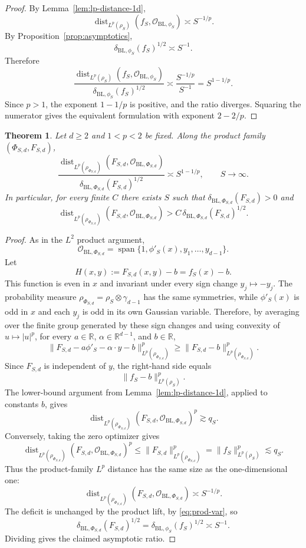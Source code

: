 \documentclass[11pt]{amsart}
\newtheorem{theorem}{Theorem}[section]
\theoremstyle{remark}
\DeclareMathOperator{\dist}{dist}
\DeclareMathOperator{\spanop}{span}
\newcommand{\R}{\mathbb R}
\newcommand{\cO}{\mathcal O}
\newcommand{\BL}{\mathrm{BL}}
\begin{document}
\begin{proof}
By Lemma~\ref{lem:lp-distance-1d},
\[
  \dist_{L^p(\rho_S)}(f_S,\cO_{\BL,\phi_S})
  \asymp S^{-1/p}.
\]
By Proposition~\ref{prop:asymptotics},
\[
  \delta_{\BL,\phi_S}(f_S)^{1/2}
  \asymp S^{-1}.
\]
Therefore
\[
  \frac{\dist_{L^p(\rho_S)}(f_S,\cO_{\BL,\phi_S})}
       {\delta_{\BL,\phi_S}(f_S)^{1/2}}
  \asymp
  \frac{S^{-1/p}}{S^{-1}}
  =
  S^{1-1/p}.
\]
Since $p>1$, the exponent $1-1/p$ is positive, and the ratio diverges. Squaring
the numerator gives the equivalent formulation with exponent $2-2/p$.
\end{proof}

\begin{theorem}\label{thm:lp-product}
Let $d\ge 2$ and $1<p<2$ be fixed. Along the product family
$(\Phi_{S,d},F_{S,d})$,
\[
  \frac{\dist_{L^p(\rho_{\Phi_{S,d}})}
       (F_{S,d},\cO_{\BL,\Phi_{S,d}})}
       {\delta_{\BL,\Phi_{S,d}}(F_{S,d})^{1/2}}
  \asymp S^{1-1/p},
  \qquad S\to\infty.
\]
In particular, for every finite $C$ there exists $S$ such that
$\delta_{\BL,\Phi_{S,d}}(F_{S,d})>0$ and
\[
  \dist_{L^p(\rho_{\Phi_{S,d}})}
       (F_{S,d},\cO_{\BL,\Phi_{S,d}})
  >
  C\,\delta_{\BL,\Phi_{S,d}}(F_{S,d})^{1/2}.
\]
\end{theorem}

\begin{proof}
As in the $L^2$ product argument,
\[
  \cO_{\BL,\Phi_{S,d}}
  =
  \spanop\{1,\phi'_S(x),y_1,\dots,y_{d-1}\}.
\]
Let
\[
  H(x,y):=F_{S,d}(x,y)-b=f_S(x)-b.
\]
This function is even in $x$ and invariant under every sign change
$y_j\mapsto -y_j$. The probability measure
$\rho_{\Phi_{S,d}}=\rho_S\otimes\gamma_{d-1}$ has the same symmetries, while
$\phi'_S(x)$ is odd in $x$ and each $y_j$ is odd in its own Gaussian variable.
Therefore, by averaging over the finite group generated by these sign changes
and using convexity of $u\mapsto |u|^p$, for every
$a\in\R$, $\alpha\in\R^{d-1}$, and $b\in\R$,
\[
  \|F_{S,d}-a\phi'_S-\alpha\cdot y-b\|_{L^p(\rho_{\Phi_{S,d}})}^p
  \ge
  \|F_{S,d}-b\|_{L^p(\rho_{\Phi_{S,d}})}^p.
\]
Since $F_{S,d}$ is independent of $y$, the right-hand side equals
\[
  \|f_S-b\|_{L^p(\rho_S)}^p.
\]
The lower-bound argument from Lemma~\ref{lem:lp-distance-1d}, applied to
constants $b$, gives
\[
  \dist_{L^p(\rho_{\Phi_{S,d}})}
       (F_{S,d},\cO_{\BL,\Phi_{S,d}})^p
  \gtrsim q_S.
\]
Conversely, taking the zero optimizer gives
\[
  \dist_{L^p(\rho_{\Phi_{S,d}})}
       (F_{S,d},\cO_{\BL,\Phi_{S,d}})^p
  \le
  \|F_{S,d}\|_{L^p(\rho_{\Phi_{S,d}})}^p
  =
  \|f_S\|_{L^p(\rho_S)}^p
  \lesssim q_S.
\]
Thus the product-family $L^p$ distance has the same size as the
one-dimensional one:
\[
  \dist_{L^p(\rho_{\Phi_{S,d}})}
       (F_{S,d},\cO_{\BL,\Phi_{S,d}})
  \asymp S^{-1/p}.
\]
The deficit is unchanged by the product lift, by \eqref{eq:prod-var}, so
\[
  \delta_{\BL,\Phi_{S,d}}(F_{S,d})^{1/2}
  =
  \delta_{\BL,\phi_S}(f_S)^{1/2}
  \asymp S^{-1}.
\]
Dividing gives the claimed asymptotic ratio.
\end{proof}
\end{document}
